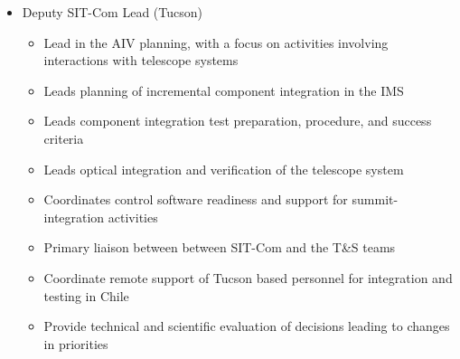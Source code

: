 \documentclass[SE,lsstdraft,authoryear,toc]{lsstdoc}
\begin{document}
\begin{itemize}
\begin{itemize}
    \end{itemize}
\item Deputy SIT-Com Lead (Tucson)
    \begin{itemize}
        \item Lead in the AIV planning, with a focus on activities involving interactions with telescope systems
        \item Leads planning of incremental component integration in the IMS
        \item Leads component integration test preparation, procedure, and success criteria
        \item Leads optical integration and verification of the telescope system
        \item Coordinates control software readiness and support for summit-integration activities
        \item Primary liaison between between SIT-Com and the T\&S teams
        \item Coordinate remote support of Tucson based personnel for integration and testing in Chile
        \item Provide technical and scientific evaluation of decisions leading to changes in priorities
    \end{itemize}
\end{itemize}
\end{document}
